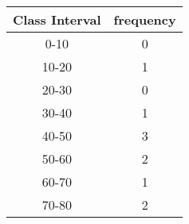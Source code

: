 	\begin{tabular}{|c|c|}
	\hline
	\textbf{Class Interval} & \textbf{frequency} \\ 
	\hline
	0-10 & 0 \\
	\hline
	10-20 & 1 \\
	\hline
	20-30 & 0 \\
	\hline
	30-40 & 1 \\
	\hline
	40-50 & 3 \\
	\hline
	50-60 & 2 \\
	\hline
	60-70 & 1 \\
	\hline
	70-80 & 2 \\
	\hline
	\end{tabular} 